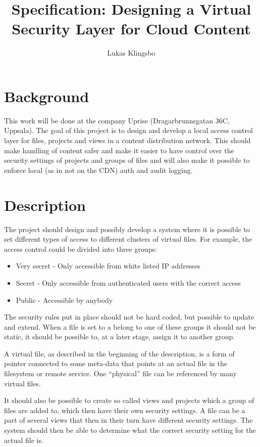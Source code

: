 \documentclass[a4paper,12pt]{article}
\title{\textbf{Specification: Designing a Virtual Security Layer for Cloud Content}}
\author{Lukas Klingsbo}
\begin{document}
\maketitle

\setcounter{tocdepth}{3}
\tableofcontents

\clearpage
{}
\setcounter{page}{1}
\section{Background}
This work will be done at the company Uprise (Dragarbrunnsgatan 36C, Uppsala). 
The goal of this project is to design and develop a local access control layer 
for files, projects and views in a content distribution network.
This should make handling of content safer and make it easier to have control 
over the security settings of projects and groups of files and will also make 
it possible to enforce local (as in not on the CDN) auth and audit logging.

\section{Description}
The project should design and possibly develop a system where it is possible 
to set different types of access to different clusters of virtual files. 
For example, the access control could be divided into three groups:
\begin{itemize}
  \item Very secret - Only accessible from white listed IP addresses
  \item Secret - Only accessible from authenticated users with the correct access
  \item Public - Accessible by anybody
\end{itemize}
The security rules put in place should not be hard coded, but possible to update 
and extend. When a file is set to a belong to one of these groups it should not be static, 
it should be possible to, at a later stage, assign it to another group.

A virtual file, as described in the beginning of the description, is a form of pointer 
connected to some meta-data that points at an actual file in the filesystem or remote 
service. One ``physical'' file can be referenced by many virtual files.

It should also be possible to create so called views and projects which a group 
of files are added to, which then have their own security settings.
A file can be a part of several views that then in their turn have different 
security settings. The system should then be able to determine what the correct 
security setting for the actual file is. 
\end{document}
